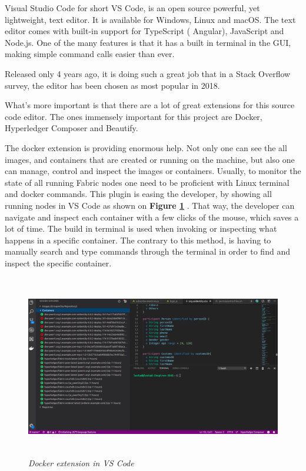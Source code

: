 \documentclass[a4paper,11pt]{report}
\begin{document}
Visual Studio Code for short VS Code, is an open source powerful, yet lightweight, text editor. It is available for Windows, Linux and macOS. The text editor comes with built-in support for TypeScript ( Angular), JavaScript and Node.js. One of the many features is that it has a built in terminal in the GUI, making simple command calls easier than ever.

Released only 4 years ago, it is doing such a great job that in a Stack Overflow survey, the editor has been chosen as most popular in 2018.\cite{stackoverflow}

What's more important is that there are a lot of great extensions for this source code editor. The ones immensely important for this project are Docker, Hyperledger Composer and Beautify. 

The docker extension is providing enormous help. Not only one can see the all images, and containers that are created or running on the machine, but also one can manage, control and inspect the images or containers. Usually, to monitor the state of all running Fabric nodes one need to be proficient with Linux terminal and docker commands. This plugin is easing the developer, by showing all running nodes in VS Code as shown on \textbf{Figure \ref{vscode}} . That way, the developer can navigate and inspect each container with a few clicks of the mouse, which saves a lot of time. The build in terminal is used when invoking or inspecting what happens in a specific container. The contrary to this method, is having to manually search and type commands through the terminal in order to find and inspect the specific container. 

\begin{figure}[h]
\centering
  \includegraphics[height=8cm,width=16cm]{vscode.png}
  \caption{\textit{Docker extension in VS Code}}
  \label{vscode}
\end{figure}
\end{document}
